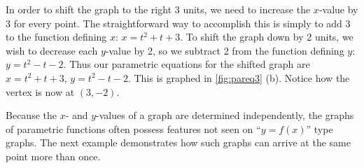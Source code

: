 \begin{example}
In order to shift the graph to the right 3 units, we need to increase the $x$-value by 3 for every point. The straightforward way to accomplish this is simply to add 3 to the function defining $x$: $x = t^2+t+3$. To shift the graph down by 2 units, we wish to decrease each $y$-value by 2, so we subtract 2 from the function defining $y$: $y = t^2-t-2$. Thus our parametric equations for the shifted graph are $x=t^2+t+3$, $y=t^2-t-2$. This is graphed in \autoref{fig:pareq3} (b). Notice how the vertex is now at $(3,-2)$.
\end{example}

Because the $x$- and $y$-values of a graph are determined independently, the graphs of parametric functions often possess features not seen on ``$y=f(x)$'' type graphs. The next example demonstrates how such graphs can arrive at the same point more than once.


